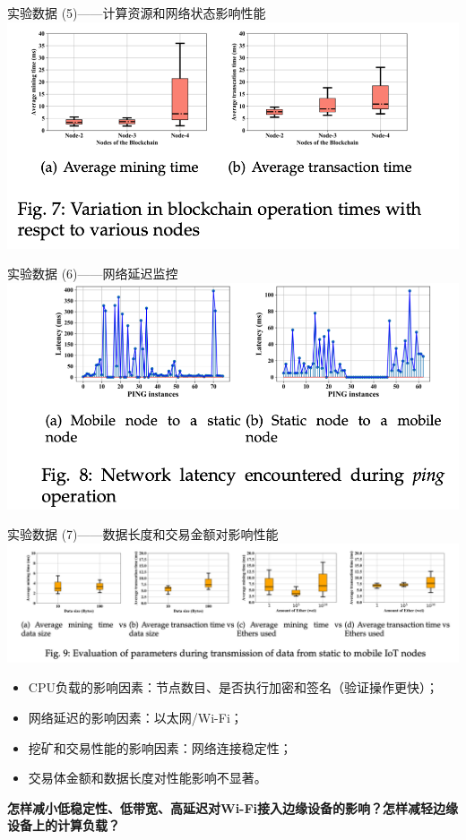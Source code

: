 \documentclass{beamer}
\begin{document}
\begin{frame}{实验数据 (5)——计算资源和网络状态影响性能}
	\includegraphics[width=\linewidth]{Assets/图7}
\end{frame}

\begin{frame}{实验数据 (6)——网络延迟监控}
	\includegraphics[width=\linewidth]{Assets/图8}
\end{frame}

\begin{frame}{实验数据 (7)——数据长度和交易金额对影响性能}
	\includegraphics[width=\linewidth]{Assets/图9}
	\begin{itemize}
		\item CPU负载的影响因素：节点数目、是否执行加密和签名（验证操作更快）；
		\item 网络延迟的影响因素：以太网/Wi-Fi；
		\item 挖矿和交易性能的影响因素：网络连接稳定性；
		\item 交易体金额和数据长度对性能影响不显著。
	\end{itemize}
	\textbf{怎样减小低稳定性、低带宽、高延迟对Wi-Fi接入边缘设备的影响？怎样减轻边缘设备上的计算负载？}
\end{frame}
\end{document}

